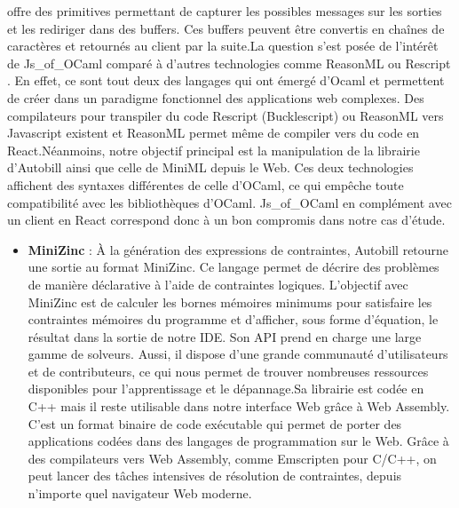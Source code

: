 \documentclass[12pt]{article}
\begin{document}
\begin{itemize}
                  offre des primitives permettant de capturer les possibles messages sur
                  les sorties et les rediriger dans des buffers. Ces buffers peuvent
                  être convertis en chaînes de caractères et retournés au client par la
                  suite.\newline  La question s'est posée de l'intérêt de Js\_of\_OCaml
                  comparé à d'autres technologies comme ReasonML
                  \cite{reasonml} ou Rescript
                  \cite{rescript}. En effet, ce sont tout
                  deux des langages qui ont émergé d'Ocaml et permettent de créer dans
                  un paradigme fonctionnel des applications web complexes. Des
                  compilateurs pour transpiler du code Rescript (Bucklescript) ou
                  ReasonML vers Javascript existent et ReasonML permet même de compiler
                  vers du code en React.\newline  Néanmoins, notre objectif principal
                  est la manipulation de la librairie d'Autobill ainsi que celle de
                  MiniML depuis le Web. Ces deux technologies affichent des syntaxes
                  différentes de celle d'OCaml, ce qui empêche toute compatibilité avec
                  les bibliothèques d'OCaml. Js\_of\_OCaml en complément avec un client
                  en React correspond donc à un bon compromis dans notre cas d'étude.
      \end{itemize}
      \begin{itemize}
            \item
                  \textbf{MiniZinc} \cite{minizinc} : À la
                  génération des expressions de contraintes, Autobill retourne une
                  sortie au format MiniZinc. Ce langage permet de décrire des problèmes
                  de manière déclarative à l'aide de contraintes logiques. L'objectif
                  avec MiniZinc est de calculer les bornes mémoires minimums pour
                  satisfaire les contraintes mémoires du programme et d'afficher, sous
                  forme d'équation, le résultat dans la sortie de notre IDE. Son API
                  prend en charge une large gamme de solveurs. Aussi, il dispose d'une
                  grande communauté d'utilisateurs et de contributeurs, ce qui nous
                  permet de trouver nombreuses ressources disponibles pour
                  l'apprentissage et le dépannage.\newline  Sa librairie est codée en
                  C++ mais il reste utilisable dans notre interface Web grâce à Web
                  Assembly. C'est un format binaire de code exécutable qui permet de
                  porter des applications codées dans des langages de programmation sur
                  le Web. Grâce à des compilateurs vers Web Assembly, comme Emscripten
                  pour C/C++, on peut lancer des tâches intensives de résolution de
                  contraintes, depuis n'importe quel navigateur Web moderne.
      \end{itemize}
\fi
\pagebreak
\end{document}
